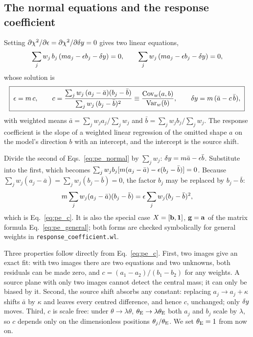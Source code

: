 \subsection{The normal equations and the response coefficient}

Setting $\partial\chi^2/\partial\epsilon=\partial\chi^2/\partial\delta y=0$
gives two linear equations,
\begin{equation}
    \sum_j w_j\,b_j\,(m a_j-\epsilon b_j-\delta y)=0,
    \qquad
    \sum_j w_j\,(m a_j-\epsilon b_j-\delta y)=0 ,
    \label{eq:pe_normal}
\end{equation}
whose solution is
\begin{equation}
    \boxed{\;
    \epsilon=m\,c,\qquad
    c=\frac{\sum_j w_j\,(a_j-\bar a)(b_j-\bar b)}{\sum_j w_j\,(b_j-\bar b)^2}
     \equiv\frac{\operatorname{Cov}_w(a,b)}{\operatorname{Var}_w(b)},
    \qquad
    \delta y=m\,(\bar a-c\,\bar b),\;}
    \label{eq:pe_c}
\end{equation}
with weighted means $\bar a=\sum_j w_ja_j/\sum_j w_j$ and
$\bar b=\sum_j w_jb_j/\sum_j w_j$. The response coefficient is the slope
of a weighted linear regression of the omitted shape $a$ on the model's
direction $b$ with an intercept, and the intercept is the source
shift.

\begin{derivation}
Divide the second of Eqs.~\eqref{eq:pe_normal} by $\sum_jw_j$:
$\delta y=m\bar a-\epsilon\bar b$. Substitute into the first, which
becomes $\sum_jw_jb_j[m(a_j-\bar a)-\epsilon(b_j-\bar b)]=0$. Because
$\sum_jw_j(a_j-\bar a)=\sum_jw_j(b_j-\bar b)=0$, the factor $b_j$ may be
replaced by $b_j-\bar b$:
\[
m\sum_jw_j(a_j-\bar a)(b_j-\bar b)=\epsilon\sum_jw_j(b_j-\bar b)^2 ,
\]
which is Eq.~\eqref{eq:pe_c}. It is also the special case
$X=[\vb{b},\vb{1}]$, $\vb{g}=\vb{a}$ of the matrix formula
Eq.~\eqref{eq:pe_general}; both forms are checked symbolically for
general weights in \texttt{response\_coefficient.wl}.
\end{derivation}

Three properties follow directly from Eq.~\eqref{eq:pe_c}. First, two
images give an exact fit: with two images there are two equations and
two unknowns, both residuals can be made zero, and
$c=(a_1-a_2)/(b_1-b_2)$ for any weights. A source plane with only two
images cannot detect the central mass; it can only be biased by it.
Second, the source shift absorbs any constant: replacing
$a_j\to a_j+\kappa$ shifts $\bar a$ by $\kappa$ and leaves every centred
difference, and hence $c$, unchanged; only $\delta y$ moves. Third,
$c$ is scale free: under $\theta\to\lambda\theta$,
$\theta_{\mathrm{E}}\to\lambda\theta_{\mathrm{E}}$ both $a_j$ and $b_j$ scale by $\lambda$, so
$c$ depends only on the dimensionless positions $\theta_j/\theta_{\mathrm{E}}$. We
set $\theta_{\mathrm{E}}=1$ from now on.

